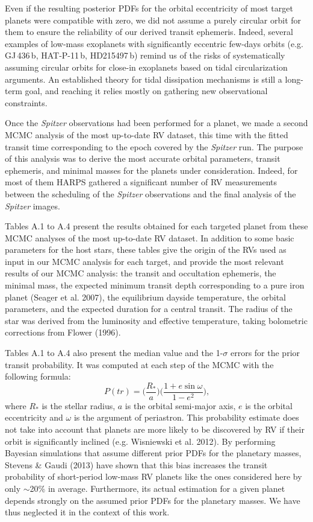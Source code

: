\documentclass[traditabstract]{aa}
\begin{document}
Even if the resulting posterior PDFs for the orbital eccentricity of most target planets were compatible with zero,
we did not assume a purely circular orbit for them to ensure the reliability of our derived transit ephemeris. Indeed, 
several examples of low-mass exoplanets with significantly eccentric few-days orbits  (e.g. GJ\,436\,b, HAT-P-11\,b, 
HD215497\,b) remind us of the risks of systematically assuming circular orbits for close-in exoplanets based on tidal 
circularization arguments. An established theory for tidal dissipation mechanisms is still a long-term goal, and reaching it 
relies mostly on gathering new observational constraints. 

Once the {\it Spitzer} observations had been performed for a planet, we made a second MCMC analysis of the most up-to-date 
RV dataset, this time with the fitted transit time corresponding to the epoch covered by the {\it Spitzer} run. The purpose of this
analysis was to derive the most accurate orbital parameters, transit ephemeris, and minimal masses for the planets
under consideration. Indeed, for most of them HARPS gathered a significant number of RV measurements between the  scheduling of the {\it Spitzer}  observations and the final analysis of the {\it Spitzer} images. 

Tables A.1 to A.4 present the results obtained for each targeted planet from these MCMC analyses of the most up-to-date RV dataset. In addition to some basic parameters for the host stars, 
these tables give the origin of the RVs used as input in our MCMC analysis for each target, and provide the most 
relevant results of our MCMC analysis: the transit and occultation ephemeris, the minimal mass, the expected minimum 
transit depth corresponding to a pure iron planet (Seager et al. 2007), the equilibrium dayside  temperature, the orbital 
parameters, and the expected duration for a central transit. The radius of the star was  derived from the luminosity and 
effective temperature, taking bolometric corrections from Flower (1996). 
 
 Tables A.1 to A.4 also present the median value and the 1-$\sigma$ errors for the prior transit  probability. It was computed 
 at each step of the MCMC with the following formula:
\begin{equation}
P(tr)  =   \bigg(\frac{R_\ast}{a}\bigg) \bigg( \frac{1+e\sin\omega}{1-e^2}\bigg) \textrm{,} 
\end{equation} where $R_\ast$ is the stellar radius, $a$ is the orbital semi-major axis, $e$ is the orbital eccentricity 
and $\omega$ is the argument of periastron. This probability estimate does not take into account that planets 
are more likely to be discovered by  RV if  their orbit is significantly inclined (e.g. Wisniewski et al. 2012). By 
performing Bayesian simulations that assume different prior PDFs for the planetary masses,
 Stevens \& Gaudi (2013) have shown that this bias increases the transit probability of short-period low-mass RV planets
like the ones considered here by only $\sim$20\% in average. Furthermore, its actual estimation for a given planet depends 
strongly on the assumed prior PDFs for the planetary masses. We have thus neglected it in the context of this work.
\end{document}
